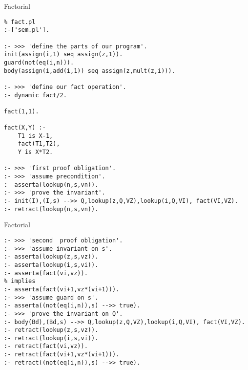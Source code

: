 \documentclass{beamer}
\begin{document}
\begin{frame}[fragile]{Factorial}

\scriptsize
\begin{verbatim}
% fact.pl
:-['sem.pl'].

:- >>> 'define the parts of our program'.
init(assign(i,1) seq assign(z,1)).
guard(not(eq(i,n))).
body(assign(i,add(i,1)) seq assign(z,mult(z,i))).

:- >>> 'define our fact operation'.
:- dynamic fact/2.

fact(1,1).

fact(X,Y) :-
    T1 is X-1,
    fact(T1,T2),
    Y is X*T2.

:- >>> 'first proof obligation'.
:- >>> 'assume precondition'.
:- asserta(lookup(n,s,vn)).                                                                        
:- >>> 'prove the invariant'.                                                                      
:- init(I),(I,s) -->> Q,lookup(z,Q,VZ),lookup(i,Q,VI), fact(VI,VZ).
:- retract(lookup(n,s,vn)).                                                                        
\end{verbatim}
\end{frame}

\begin{frame}[fragile]{Factorial}

\scriptsize
\begin{verbatim}
:- >>> 'second  proof obligation'.                                                                 
:- >>> 'assume invariant on s'.                                                                    
:- asserta(lookup(z,s,vz)).
:- asserta(lookup(i,s,vi)).                                                                        
:- asserta(fact(vi,vz)).                                                                           
% implies                                                                                          
:- asserta(fact(vi+1,vz*(vi+1))).                                                                  
:- >>> 'assume guard on s'.                                                                        
:- asserta((not(eq(i,n)),s) -->> true).
:- >>> 'prove the invariant on Q'.
:- body(Bd),(Bd,s) -->> Q,lookup(z,Q,VZ),lookup(i,Q,VI), fact(VI,VZ).
:- retract(lookup(z,s,vz)).                                                                        
:- retract(lookup(i,s,vi)).
:- retract(fact(vi,vz)).
:- retract(fact(vi+1,vz*(vi+1))).
:- retract((not(eq(i,n)),s) -->> true).
\end{verbatim}
\end{frame}
\end{document}
